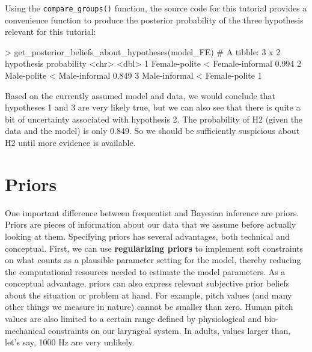\documentclass[nobib]{tufte-handout}
\begin{document}
Using the \texttt{compare\_groups()} function, the source code for this tutorial provides a
convenience function to produce the posterior probability of the three hypothesis relevant for
this tutorial: 

\medskip

\begin{minipage}[]{\textwidth}
\begin{rc}
> get_posterior_beliefs_about_hypotheses(model_FE)
# A tibble: 3 x 2
  hypothesis                      probability
  <chr>                                 <dbl>
1 Female-polite < Female-informal       0.994
2 Male-polite < Male-informal           0.849
3 Male-informal < Female-polite         1
\end{rc}
\end{minipage}

Based on the currently assumed model and data, we would conclude that hypotheses 1 and 3 are very likely true, but we can also see that there is quite a bit of uncertainty associated with hypothesis 2. The probability of H2 (given the data and the model) is only 0.849. So we should be sufficiently suspicious about H2 until more evidence is available.

%

\section{Priors}

One important difference between frequentist and Bayesian inference are priors. Priors are pieces of information about our data that we assume before actually looking at them. Specifying priors has several advantages, both technical and conceptual. First, we can use \textbf{regularizing priors} to implement soft constraints on what counts as a plausible parameter setting for the model, thereby reducing the computational resources needed to estimate the model parameters.
%
%
As a conceptual advantage, priors can also express relevant subjective prior beliefs about the situation or problem at hand. For example, pitch values (and many other things we measure in nature) cannot be smaller than zero. Human pitch values are also limited to a certain range defined by physiological and bio-mechanical constraints on our laryngeal system. In adults, values larger than, let's say, 1000 Hz are very unlikely. 
 
\end{document}
